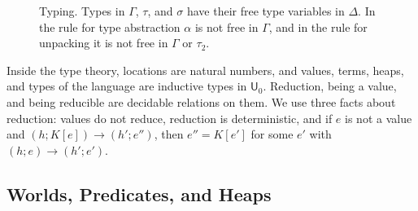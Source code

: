 \documentclass[acmsmall,nonacm,screen]{acmart}
\newcommand{\Uv}{\mathsf{U}}
\newcommand{\kw}[1]{\mathsf{#1}}
\begin{document}
\begin{figure}
\small
{}
\caption{Typing. Types in $\Gamma$, $\tau$, and $\sigma$ have their free type variables in
$\Delta$. In the rule for type abstraction $\alpha$ is not free in $\Gamma$, and in the rule
for unpacking it is not free in $\Gamma$ or $\tau_2$.}
\label{fig:typing}
\end{figure}

Inside the type theory, locations are natural numbers, and values, terms, heaps, and types
of the language are inductive types in $\Uv_0$. Reduction, being a value, and being
reducible are decidable relations on them. We use three facts about reduction: values do
not reduce, reduction is deterministic, and if $e$ is not a value and
$(h;K[e]) \longrightarrow (h';e'')$, then $e'' = K[e']$ for some $e'$ with
$(h;e) \longrightarrow (h';e')$.

\subsection{Worlds, Predicates, and Heaps}
\end{document}
